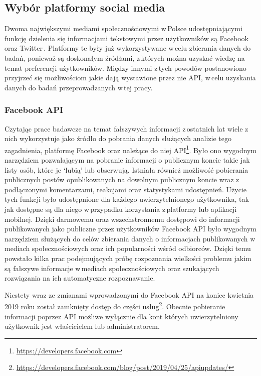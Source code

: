 
\subsection{Wybór platformy social media}
Dwoma największymi mediami społecznościowymi w\,Polsce udostępniającymi funkcję dzielenia się informacjami tekstowymi przez użytkowników są Facebook oraz Twitter\,\cite{GemiusSerwisy2019}. Platformy te były już wykorzystywane w\,celu zbierania danych do badań, ponieważ są doskonałym źródłami, z\,których można uzyskać wiedzę na temat preferencji użytkowników. Między innymi z\,tych powodów postanowiono przyjrzeć się możliwościom jakie dają wystawione przez nie API, w\,celu uzyskania danych do badań przeprowadzanych w\,tej pracy.

\subsubsection{Facebook API}
Czytając prace badawcze na temat fałszywych informacji z\,ostatnich lat wiele z\,nich wykorzystuje jako źródło do pobrania danych służących analizie tego zagadnienia, platformę Facebook oraz należące do niej API\footnote{\url{https://developers.facebook.com}}. Było ono wygodnym narzędziem pozwalającym na pobranie informacji o publicznym koncie takie jak listy osób, które je ‘lubią’ lub obserwują. Istniała również możliwość pobierania publicznych postów opublikowanych na dowolnym publicznym koncie wraz z\,podłączonymi komentarzami, reakcjami oraz statystykami udostępnień. Użycie tych funkcji było udostępnione dla każdego uwierzytelnionego użytkownika, tak jak dostępne są dla niego w\,przypadku korzystania z\,platformy lub aplikacji mobilnej. Dzięki darmowemu oraz wszechstronnemu dostępowi do informacji publikowanych jako publiczne przez użytkowników Facebook API było wygodnym narzędziem służących do celów zbierania danych o informacjach publikowanych w\,mediach społecznościowych oraz ich popularności wśród odbiorców. Dzięki temu powstało kilka prac podejmujących próbę rozpoznania wielkości problemu jakim są fałszywe informacje w\,mediach społecznościowych oraz szukających rozwiązania na ich automatyczne rozpoznawanie. 
\par
Niestety wraz ze zmianami wprowadzonymi do Facebook API na koniec kwietnia 2019 roku został zamknięty dostęp do części usług\footnote{\url{https://developers.facebook.com/blog/post/2019/04/25/apiupdates/}}. Obecnie pobieranie informacji poprzez API możliwe wyłącznie dla kont których uwierzytelniony użytkownik jest właścicielem lub administratorem.
